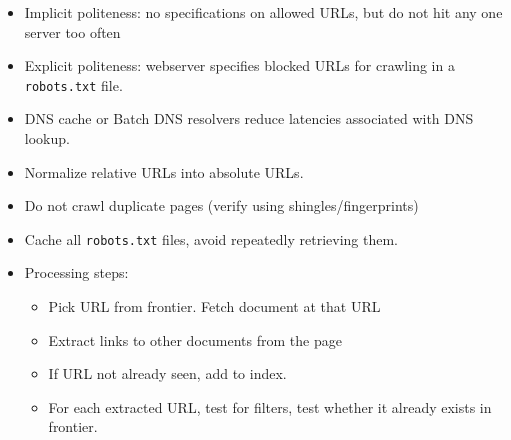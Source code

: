 \documentclass{article}
\begin{document}
\begin{itemize}
    \item Implicit politeness: no specifications on allowed URLs, but do not hit any one server too often
    
    \item Explicit politeness: webserver specifies blocked URLs for crawling in a \texttt{robots.txt} file.
    
    \item DNS cache or Batch DNS resolvers reduce latencies associated with DNS lookup.
    
    \item Normalize relative URLs into absolute URLs.
    
    \item Do not crawl duplicate pages (verify using shingles/fingerprints)
    
    \item Cache all \texttt{robots.txt} files, avoid repeatedly retrieving them. 
    \item Processing steps:
    \begin{itemize}
        \item Pick URL from frontier. Fetch document at that URL
        
        \item Extract links to other documents from the page
        
        \item If URL not already seen, add to index. 
        
        \item For each extracted URL, test for filters, test whether it already exists in frontier. 
    \end{itemize}
\end{itemize}
\end{document}
